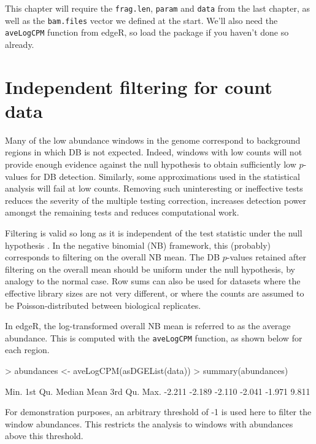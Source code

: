 \documentclass[12pt]{report}
\renewenvironment{Schunk}{\vspace{0pt}}{\vspace{0pt}}
\newcommand{\edger}{edgeR}
\newcommand{\code}[1]{{\small\texttt{#1}}}
\newenvironment{combox}
{ \begin{shaded}\begin{center}\begin{minipage}[t]{0.95\textwidth} }
{ \end{minipage}\end{center}\end{shaded} }
\begin{document}
\begin{combox}
This chapter will require the \code{frag.len}, \code{param} and \code{data} from the last chapter, as well as the \code{bam.files} vector we defined at the start.
We'll also need the \code{aveLogCPM} function from \edger{}, so load the package if you haven't done so already.
\end{combox}

\section{Independent filtering for count data}
Many of the low abundance windows in the genome correspond to background regions in which DB is not expected. 
Indeed, windows with low counts will not provide enough evidence against the null hypothesis to obtain sufficiently low $p$-values for DB detection. 
Similarly, some approximations used in the statistical analysis will fail at low counts. 
Removing such uninteresting or ineffective tests reduces the severity of the multiple testing correction, increases detection power amongst the remaining tests and reduces computational work.

Filtering is valid so long as it is independent of the test statistic under the null hypothesis \citep{bourgon2010}. 
In the negative binomial (NB) framework, this (probably) corresponds to filtering on the overall NB mean. 
The DB $p$-values retained after filtering on the overall mean should be uniform under the null hypothesis, by analogy to the normal case. 
Row sums can also be used for datasets where the effective library sizes are not very different, or where the counts are assumed to be Poisson-distributed between biological replicates. 

In \edger{}, the log-transformed overall NB mean is referred to as the average abundance.
This is computed with the \code{aveLogCPM} function, as shown below for each region.

\begin{Schunk}
\begin{Sinput}
> abundances <- aveLogCPM(asDGEList(data))
> summary(abundances)
\end{Sinput}
\begin{Soutput}
   Min. 1st Qu.  Median    Mean 3rd Qu.    Max. 
 -2.211  -2.189  -2.110  -2.041  -1.971   9.811 
\end{Soutput}
\end{Schunk}

For demonstration purposes, an arbitrary threshold of -1 is used here to filter the window abundances. 
This restricts the analysis to windows with abundances above this threshold.
\end{document}

